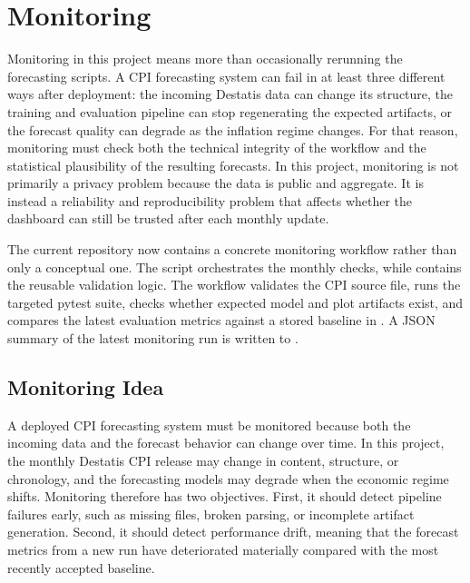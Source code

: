 %
%
%

\chapter{Monitoring}

Monitoring in this project means more than occasionally rerunning the forecasting scripts. A CPI forecasting system can fail in at least three different ways after deployment: the incoming Destatis data can change its structure, the training and evaluation pipeline can stop regenerating the expected artifacts, or the forecast quality can degrade as the inflation regime changes. For that reason, monitoring must check both the technical integrity of the workflow and the statistical plausibility of the resulting forecasts. In this project, monitoring is not primarily a privacy problem because the data is public and aggregate. It is instead a reliability and reproducibility problem that affects whether the dashboard can still be trusted after each monthly update.

The current repository now contains a concrete monitoring workflow rather than only a conceptual one. The script  orchestrates the monthly checks, while  contains the reusable validation logic. The workflow validates the CPI source file, runs the targeted pytest suite, checks whether expected model and plot artifacts exist, and compares the latest evaluation metrics against a stored baseline in . A JSON summary of the latest monitoring run is written to .

\section{Monitoring Idea}

A deployed CPI forecasting system must be monitored because both the incoming data and the forecast behavior can change over time. In this project, the monthly Destatis CPI release may change in content, structure, or chronology, and the forecasting models may degrade when the economic regime shifts. Monitoring therefore has two objectives. First, it should detect pipeline failures early, such as missing files, broken parsing, or incomplete artifact generation. Second, it should detect performance drift, meaning that the forecast metrics from a new run have deteriorated materially compared with the most recently accepted baseline.

